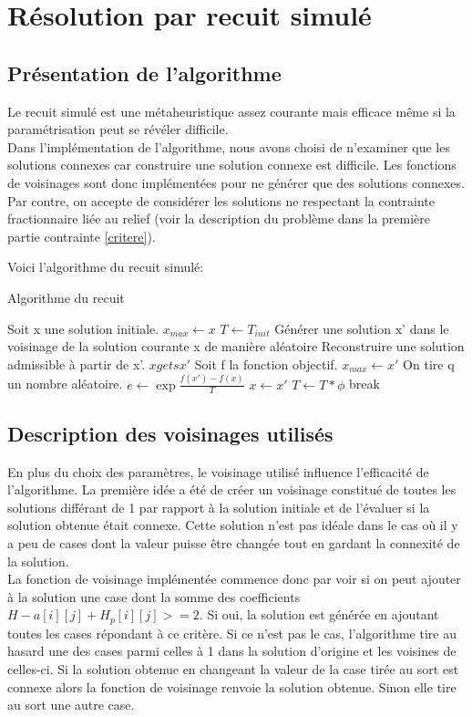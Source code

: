 \documentclass[12pt,a4paper]{article}
\begin{document}
\section{Résolution par recuit simulé}
\subsection{Présentation de l'algorithme}
Le recuit simulé est une métaheuristique assez courante mais efficace même si la paramétrisation peut se révéler difficile.\\
Dans l'implémentation de l'algorithme, nous avons choisi de n'examiner que les solutions connexes car construire une solution connexe est difficile. Les fonctions de voisinages sont donc implémentées pour ne générer que des solutions connexes.\\ 
Par contre, on accepte de considérer les solutions ne respectant la contrainte fractionnaire liée au relief (voir la description du problème dans la première partie contrainte \ref{critere}).

Voici l'algorithme du recuit simulé:
\begin{algorithm}
	\caption{Algorithme du recuit}
	\begin{algorithmic}[1]
		\STATE Soit x une solution initiale.
		\STATE $x_{max} \gets x$
		\STATE $T\gets T_{init}$
		\STATE Générer une solution x' dans le voisinage de la solution courante x de manière aléatoire
		\STATE Reconstruire une solution admissible à partir de x'.
		\STATE $x gets x'$
		\STATE Soit f la fonction objectif.
		\STATE $x_{max} \gets x'$
		\ENDIF
		\ELSE
		\STATE On tire q un nombre aléatoire.
		\STATE $e\gets \exp{\frac{f(x')-f(x)}{T}}$
		\STATE $x \gets x'$
		\ENDIF
		\ENDIF
		\ENDFOR
		\STATE $T\gets T*\phi$
		\STATE break
		\ENDIF
		\ENDFOR
	\end{algorithmic}
\end{algorithm}
\subsection{Description des voisinages utilisés}
En plus du choix des paramètres, le voisinage utilisé influence l'efficacité de l'algorithme. La première idée a été de créer un voisinage constitué de toutes les solutions différant de 1 par rapport à la solution initiale et de l'évaluer si la solution obtenue était connexe. Cette solution n'est pas idéale dans le cas où il y a peu de cases dont la valeur puisse être changée tout en gardant la connexité de la solution.\\
La fonction de voisinage implémentée commence donc par voir si on peut ajouter à la solution une case dont la somme des coefficients $H-a[i][j]+H_p[i][j]>=2$. Si oui, la solution est générée en ajoutant toutes les cases répondant à ce critère. Si ce n'est pas le cas, l'algorithme tire au hasard une des cases parmi celles à 1 dans la solution d'origine et les voisines de celles-ci. Si la solution obtenue en changeant la valeur de la case tirée au sort est connexe alors la fonction de voisinage renvoie la solution obtenue. Sinon elle tire au sort une autre case.
\end{document}

